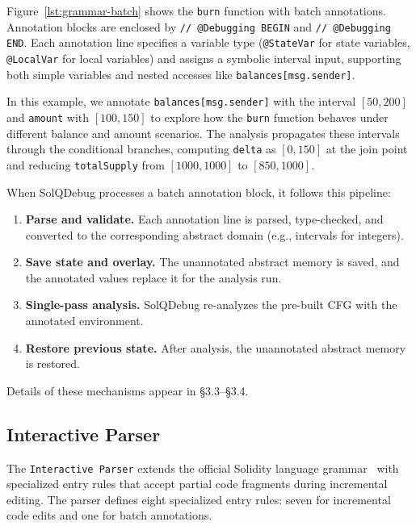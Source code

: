 \documentclass[pdflatex,sn-basic]{sn-jnl}%
\theoremstyle{thmstyleone}%
\theoremstyle{thmstyletwo}%
\theoremstyle{thmstylethree}%
\begin{document}
Figure~\ref{lst:grammar-batch} shows the \texttt{burn} function with batch annotations.
        Annotation blocks are enclosed by \verb|// @Debugging BEGIN| and \verb|// @Debugging END|.
        Each annotation line specifies a variable type (\texttt{@StateVar} for state variables,
        \texttt{@LocalVar} for local variables) and assigns a symbolic interval input, supporting both
        simple variables and nested accesses like \texttt{balances[msg.sender]}.

In this example, we annotate \texttt{balances[msg.sender]} with the interval \([50,200]\)
        and \texttt{amount} with \([100,150]\) to explore how the \texttt{burn} function behaves
        under different balance and amount scenarios. The analysis propagates these intervals through
        the conditional branches, computing \texttt{delta} as \([0,150]\) at the join point and
        reducing \texttt{totalSupply} from \([1000,1000]\) to \([850,1000]\).

        When SolQDebug processes a batch annotation block, it follows this pipeline:

\begin{enumerate}
  \item \textbf{Parse and validate.} Each annotation line is parsed, type-checked, and converted
        to the corresponding abstract domain (e.g., intervals for integers).
  \item \textbf{Save state and overlay.} The unannotated abstract memory is saved, and the annotated
        values replace it for the analysis run.
  \item \textbf{Single-pass analysis.} SolQDebug re-analyzes the pre-built CFG with
        the annotated environment.
  \item \textbf{Restore previous state.} After analysis, the unannotated abstract memory is restored.
\end{enumerate}

Details of these mechanisms appear in \S{}3.3--\S{}3.4.

\subsection{Interactive Parser}

The \texttt{Interactive Parser} extends the official Solidity language grammar~\citep{solgram} with specialized entry rules
that accept partial code fragments during incremental editing.
The parser defines eight specialized entry rules: seven for incremental code edits
and one for batch annotations.
\end{document}
